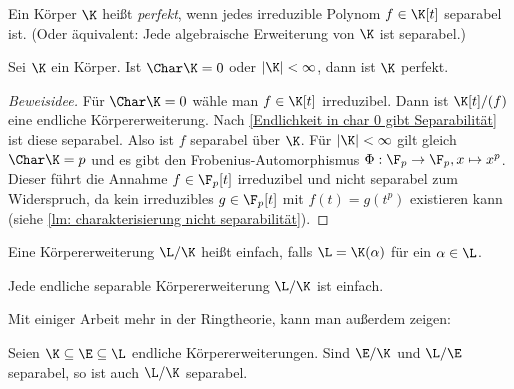 \documentclass[11pt, a4paper]{article}
\begin{document}
\begin{definition} \Theorem
    Ein Körper $\K$ heißt \emph{perfekt}, wenn jedes irreduzible Polynom $f\in \K[t]$ separabel ist. (Oder äquivalent: Jede algebraische Erweiterung von $\K$ ist separabel.)
\end{definition}

\begin{mdbox}
\begin{theorem}\label{über Perfekte Körper}
    Sei $\K$ ein Körper. Ist $\Char \K = 0$ oder $|\K|<\infty$, dann ist $\K$ perfekt.
\end{theorem}
\end{mdbox}

\begin{proof}[Beweisidee] Für $\Char \K = 0$ wähle man $f\in \K[t]$ irreduzibel. Dann ist $\K[t]/(f)$ eine endliche Körpererweiterung. Nach \ref{Endlichkeit in char 0 gibt Separabilität} ist diese separabel. Also ist $f$ separabel über $\K$. Für $|\K|<\infty$ gilt gleich $\Char \K = p$ und es gibt den Frobenius-Automorphismus $\Phi: \F_p \to \F_p, x\mapsto x^p$. Dieser führt die Annahme $f\in \F_p[t]$ irreduzibel und nicht separabel zum Widerspruch, da kein irreduzibles $g\in \F_p[t]$ mit $f(t)=g(t^p)$ existieren kann (siehe \ref{lm: charakterisierung nicht separabilität}).
\end{proof}

\newpage


\begin{definition} \label{Einfache Erweiterung}
Eine Körpererweiterung $\L/\K$ heißt einfach, falls $\L = \K(\alpha)$ für ein $\alpha\in \L$.
\end{definition}

\begin{mdbox}
\begin{theorem} \Theorem
    Jede endliche separable Körpererweiterung $\L/\K$ ist einfach. 
\end{theorem}
\end{mdbox}

Mit einiger Arbeit mehr in der Ringtheorie, kann man außerdem zeigen:

\begin{corollary}
    Seien $\K \subseteq \E \subseteq \L$ endliche Körpererweiterungen. Sind $\E/\K$ und $\L/\E$ separabel, so ist auch $\L/\K$ separabel.
\end{corollary}
\end{document}

